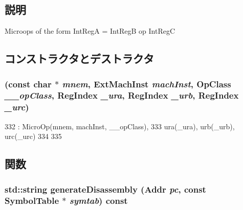 \subsection{説明}
Microops of the form IntRegA = IntRegB op IntRegC 

\subsection{コンストラクタとデストラクタ}
\hypertarget{classArmISA_1_1MicroIntOp_a5da9f4c4044633746772068d6b292e51}{
\subsubsection[{MicroIntOp}]{ (const char $\ast$ {\em mnem}, \/  {\bf ExtMachInst} {\em machInst}, \/  OpClass {\em \_\-\_\-opClass}, \/  {\bf RegIndex} {\em \_\-ura}, \/  {\bf RegIndex} {\em \_\-urb}, \/  {\bf RegIndex} {\em \_\-urc})}}
\label{classArmISA_1_1MicroIntOp_a5da9f4c4044633746772068d6b292e51}



\begin{DoxyCode}
332             : MicroOp(mnem, machInst, __opClass),
333               ura(_ura), urb(_urb), urc(_urc)
334     {
335     }
\end{DoxyCode}


\subsection{関数}
\hypertarget{classArmISA_1_1MicroIntOp_a95d323a22a5f07e14d6b4c9385a91896}{
\subsubsection[{generateDisassembly}]{\setlength{\rightskip}{0pt plus 5cm}std::string generateDisassembly ({\bf Addr} {\em pc}, \/  const SymbolTable $\ast$ {\em symtab}) const}}
\label{classArmISA_1_1MicroIntOp_a95d323a22a5f07e14d6b4c9385a91896}



